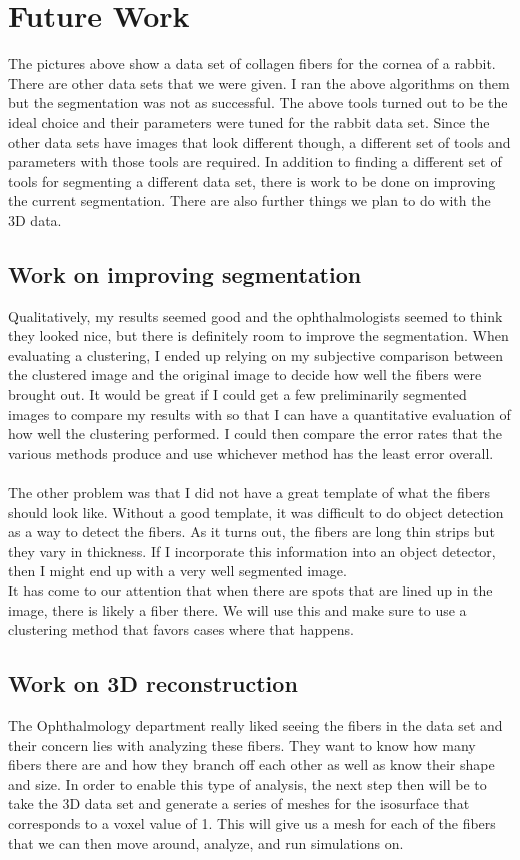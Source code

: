 \documentclass[11pt,psfig]{article}
\begin{document}
\section*{Future Work}

The pictures above show a data set of collagen fibers for the cornea of a rabbit. There are other data sets that we were given. I ran the above algorithms on them but the segmentation was not as successful. The above tools turned out to be the ideal choice and their parameters were tuned for the rabbit data set. Since the other data sets have images that look different though, a different set of tools and parameters with those tools are required. In addition to finding a different set of tools for segmenting a different data set, there is work to be done on improving the current segmentation. There are also further things we plan to do with the 3D data. 

\subsection*{Work on improving segmentation}

Qualitatively, my results seemed good and the ophthalmologists seemed to think they looked nice, but there is definitely room to improve the segmentation. When evaluating a clustering, I ended up relying on my subjective comparison between the clustered image and the original image to decide how well the fibers were brought out. It would be great if I could get a few preliminarily segmented images to compare my results with so that I can have a quantitative evaluation of how well the clustering performed. I could then compare the error rates that the various methods produce and use whichever method has the least error overall. \\
\\
The other problem was that I did not have a great template of what the fibers should look like. Without a good template, it was difficult to do object detection as a way to detect the fibers. As it turns out, the fibers are long thin strips but they vary in thickness. If I incorporate this information into an object detector, then I might end up with a very well segmented image. 
\\
It has come to our attention that when there are spots that are lined up in the image, there is likely a fiber there. We will use this and make sure to use a clustering method that favors cases where that happens. 

\subsection*{Work on 3D reconstruction}

The Ophthalmology department really liked seeing the fibers in the data set and their concern lies with analyzing these fibers. They want to know how many fibers there are and how they branch off each other as well as know their shape and size. In order to enable this type of analysis, the next step then will be to take the 3D data set and generate a series of meshes for the isosurface that corresponds to a voxel value of 1. This will give us a mesh for each of the fibers that we can then move around, analyze, and run simulations on.  
\end{document}
